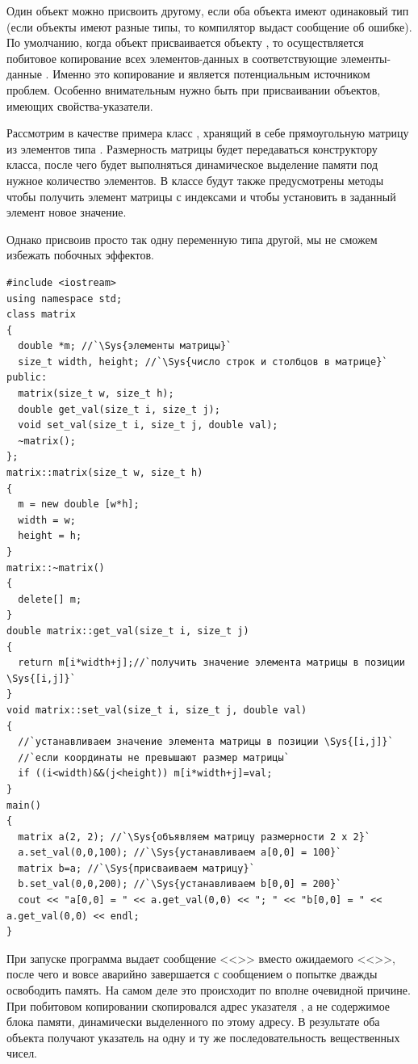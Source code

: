 Один объект можно присвоить другому, если оба объекта имеют одинаковый тип (если объекты имеют разные типы, то
компилятор выдаст сообщение об ошибке). По умолчанию, когда объект  присваивается объекту
, то осуществляется побитовое копирование всех элементов-данных  в
соответствующие элементы-данные . Именно это копирование и является потенциальным источником
проблем. Особенно внимательным нужно быть при присваивании объектов, имеющих
свойства-указатели.

Рассмотрим в качестве примера класс , хранящий в
себе прямоугольную матрицу из элементов типа . Размерность матрицы
будет передаваться конструктору класса, после чего будет выполняться динамическое выделение памяти под нужное
количество элементов. В классе будут также предусмотрены методы 
чтобы получить элемент матрицы с индексами  и
 чтобы установить в заданный элемент новое значение. 

Однако присвоив просто так одну переменную типа 
другой, мы не сможем избежать побочных эффектов.
\begin{lstlisting}
#include <iostream>
using namespace std;
class matrix 
{
  double *m; //`\Sys{элементы матрицы}`
  size_t width, height; //`\Sys{число строк и столбцов в матрице}`
public:
  matrix(size_t w, size_t h);
  double get_val(size_t i, size_t j); 
  void set_val(size_t i, size_t j, double val);
  ~matrix();
};
matrix::matrix(size_t w, size_t h) 
{ 
  m = new double [w*h]; 
  width = w;
  height = h;
}
matrix::~matrix() 
{ 
  delete[] m; 
}
double matrix::get_val(size_t i, size_t j) 
{
  return m[i*width+j];//`получить значение элемента матрицы в позиции \Sys{[i,j]}`
}
void matrix::set_val(size_t i, size_t j, double val) 
{
  //`устанавливаем значение элемента матрицы в позиции \Sys{[i,j]}`
  //`если координаты не превышают размер матрицы`
  if ((i<width)&&(j<height)) m[i*width+j]=val;
}	
main() 
{
  matrix a(2, 2); //`\Sys{объявляем матрицу размерности 2 х 2}`
  a.set_val(0,0,100); //`\Sys{устанавливаем a[0,0] = 100}`
  matrix b=a; //`\Sys{присваиваем матрицу}`
  b.set_val(0,0,200); //`\Sys{устанавливаем b[0,0] = 200}`
  cout << "a[0,0] = " << a.get_val(0,0) << "; " << "b[0,0] = " << a.get_val(0,0) << endl;
}
\end{lstlisting}

При запуске программа выдает сообщение <<>>  вместо ожидаемого
<<>>, после чего и вовсе аварийно завершается с сообщением о попытке дважды освободить
память. На самом деле это происходит по вполне очевидной причине. При побитовом копировании скопировался адрес
указателя , а не содержимое блока памяти, динамически выделенного по этому адресу. В результате оба
объекта получают указатель на одну и ту же последовательность вещественных чисел.

